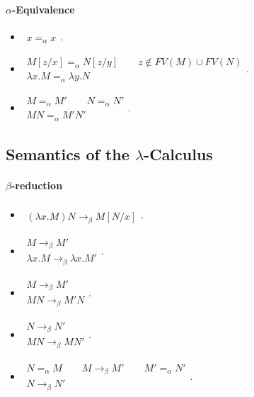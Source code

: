 \documentclass[twocolumn,english]{article}
\begin{document}
\paragraph{$\alpha$-Equivalence}
\begin{itemize}
\item $\begin{array}{c}
\\
\hline x=_{\alpha}x
\end{array}$. 
\item $\begin{array}{c}
M\left[z/x\right]=_{\alpha}N\left[z/y\right]\qquad z\notin FV\left(M\right)\cup FV\left(N\right)\\
\hline \lambda x.M=_{\alpha}\lambda y.N
\end{array}$. 
\item $\begin{array}{c}
M=_{\alpha}M'\qquad N=_{\alpha}N'\\
\hline MN=_{\alpha}M'N'
\end{array}$. 
\end{itemize}

\subsection{Semantics of the $\lambda$-Calculus}


\paragraph{$\beta$-reduction}
\begin{itemize}
\item $\begin{array}{c}
\\
\hline \left(\lambda x.M\right)N\rightarrow_{\beta}M\left[N/x\right]
\end{array}$. 
\item $\begin{array}{c}
M\rightarrow_{\beta}M'\\
\hline \lambda x.M\rightarrow_{\beta}\lambda x.M'
\end{array}$. 
\item $\begin{array}{c}
M\rightarrow_{\beta}M'\\
\hline MN\rightarrow_{\beta}M'N
\end{array}$. 
\item $\begin{array}{c}
N\rightarrow_{\beta}N'\\
\hline MN\rightarrow_{\beta}MN'
\end{array}$. 
\item $\begin{array}{c}
N=_{\alpha}M\qquad M\rightarrow_{\beta}M'\qquad M'=_{\alpha}N'\\
\hline N\rightarrow_{\beta}N'
\end{array}$. 
\end{itemize}
\end{document}
